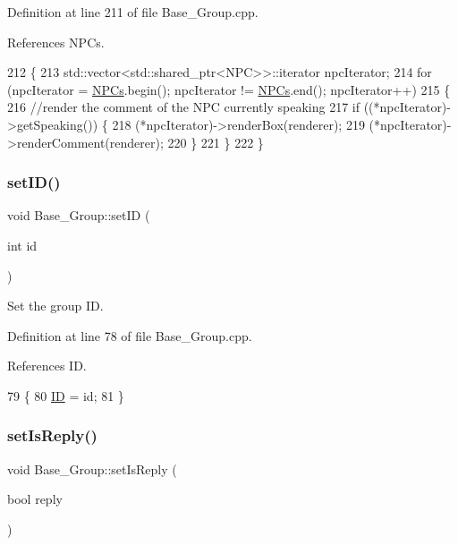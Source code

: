 Definition at line 211 of file Base\+\_\+\+Group.\+cpp.



References N\+P\+Cs.


\begin{DoxyCode}
212 \{
213     std::vector<std::shared\_ptr<NPC>>::iterator npcIterator;
214     \textcolor{keywordflow}{for} (npcIterator = \hyperlink{class_base___group_a4757f3c06c73eea029f71b871c1d863e}{NPCs}.begin(); npcIterator != \hyperlink{class_base___group_a4757f3c06c73eea029f71b871c1d863e}{NPCs}.end(); npcIterator++)
215     \{
216         \textcolor{comment}{//render the comment of the NPC currently speaking}
217         \textcolor{keywordflow}{if} ((*npcIterator)->getSpeaking()) \{
218             (*npcIterator)->renderBox(renderer);
219             (*npcIterator)->renderComment(renderer);
220         \}
221     \}
222 \}
\end{DoxyCode}
\mbox{\label{class_base___group_acc6c0adb1efeb47579da87d98450a98a}} 
\subsubsection{\texorpdfstring{set\+I\+D()}{setID()}}
{\footnotesize\ttfamily void Base\+\_\+\+Group\+::set\+ID (\begin{DoxyParamCaption}\item[{int}]{id }\end{DoxyParamCaption})}



Set the group ID. 



Definition at line 78 of file Base\+\_\+\+Group.\+cpp.



References ID.


\begin{DoxyCode}
79 \{
80     \hyperlink{class_base___group_ae6ea7525642b45edafb56589d9945f90}{ID} = id;
81 \}
\end{DoxyCode}
\mbox{\label{class_base___group_aebe2b457ac29aefcc7105908a61460c8}} 
\subsubsection{\texorpdfstring{set\+Is\+Reply()}{setIsReply()}}
{\footnotesize\ttfamily void Base\+\_\+\+Group\+::set\+Is\+Reply (\begin{DoxyParamCaption}\item[{bool}]{reply }\end{DoxyParamCaption})}



